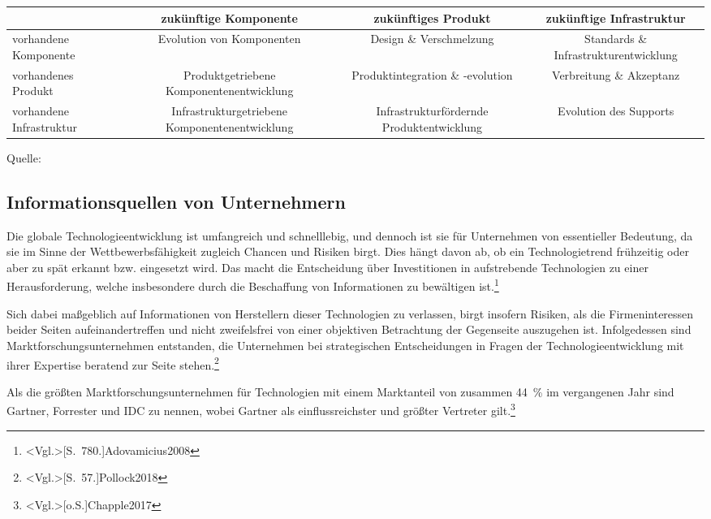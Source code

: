 \begin{center}
\label{tab:influence_path}
\begin{tabulary}{\textwidth}{|L|C|C|C|}
	\hline
	 & zukünftige Komponente & zukünftiges Produkt & zukünftige Infrastruktur \\ 
	\hline 
	vorhandene Komponente & Evolution von Komponenten & Design \& Verschmelzung & Standards \& Infrastruktur\-entwicklung \\ 
	\hline 
	vorhandenes Produkt & Produktgetriebene Komponenten\-entwicklung & Produktintegration \& -evolution & Verbreitung \& Akzeptanz \\ 
	\hline 
	vorhandene Infrastruktur & Infrastrukturgetriebene Komponenten\-entwicklung & Infrastruktur\-fördernde Produktentwicklung & Evolution des Supports \\ 
	\hline
\end{tabulary}\par
\bigskip
Quelle: 
\end{center}

\subsection{Informationsquellen von Unternehmern}
Die globale Technologieentwicklung ist umfangreich und schnelllebig, und dennoch ist sie für Unternehmen von essentieller Bedeutung, da sie im Sinne der Wettbewerbsfähigkeit zugleich Chancen und Risiken birgt. Dies hängt davon ab, ob ein Technologietrend frühzeitig oder aber zu spät erkannt bzw. eingesetzt wird. Das macht die Entscheidung über Investitionen in aufstrebende Technologien zu einer Herausforderung, welche insbesondere durch die Beschaffung von Informationen zu bewältigen ist.\footnote{\citeNP<Vgl.>[S.~780.]{Adovamicius2008}}

Sich dabei maßgeblich auf Informationen von Herstellern dieser Technologien zu verlassen, birgt insofern Risiken, als die Firmeninteressen beider Seiten aufeinandertreffen und nicht zweifelsfrei von einer objektiven Betrachtung der Gegenseite auszugehen ist. Infolgedessen sind Marktforschungsunternehmen entstanden, die Unternehmen bei strategischen Entscheidungen in Fragen der Technologieentwicklung mit ihrer Expertise beratend zur Seite stehen.\footnote{\citeNP<Vgl.>[S.~57.]{Pollock2018}}

Als die größten Marktforschungsunternehmen für Technologien mit einem Marktanteil von zusammen 44~\% im vergangenen Jahr sind Gartner, Forrester und IDC zu nennen, wobei Gartner als einflussreichster und größter Vertreter gilt.\footnote{\citeNP<Vgl.>[o.S.]{Chapple2017}}

